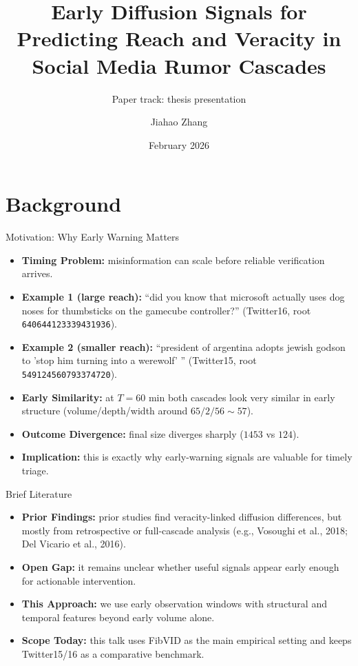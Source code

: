 \documentclass{beamer}
\title{Early Diffusion Signals for Predicting Reach and Veracity in Social Media Rumor Cascades}
\subtitle{Paper track: thesis presentation}
\author{Jiahao Zhang}
\institute{University of Chicago}
\date{February 2026}
\begin{document}
\section{Background}
\begin{frame}
\titlepage
\end{frame}

\begin{frame}{Motivation: Why Early Warning Matters}
\begin{itemize}
\item \textbf{Timing Problem:} misinformation can scale before reliable verification arrives.
\item \textbf{Example 1 (large reach):} ``did you know that microsoft actually uses dog noses for thumbsticks on the gamecube controller?'' (Twitter16, root \texttt{640644123339431936}).
\item \textbf{Example 2 (smaller reach):} ``president of argentina adopts jewish godson to 'stop him turning into a werewolf' '' (Twitter15, root \texttt{549124560793374720}).
\item \textbf{Early Similarity:} at \(T=60\) min both cascades look very similar in early structure (volume/depth/width around \(65/2/56\sim57\)).
\item \textbf{Outcome Divergence:} final size diverges sharply (\(1453\) vs \(124\)).
\item \textbf{Implication:} this is exactly why early-warning signals are valuable for timely triage.
\end{itemize}
\end{frame}

\begin{frame}{Brief Literature}
\begin{itemize}
\item \textbf{Prior Findings:} prior studies find veracity-linked diffusion differences, but mostly from retrospective or full-cascade analysis (e.g., Vosoughi et al., 2018; Del Vicario et al., 2016).
\item \textbf{Open Gap:} it remains unclear whether useful signals appear early enough for actionable intervention.
\item \textbf{This Approach:} we use early observation windows with structural and temporal features beyond early volume alone.
\item \textbf{Scope Today:} this talk uses FibVID as the main empirical setting and keeps Twitter15/16 as a comparative benchmark.
\end{itemize}
\end{frame}
\end{document}
